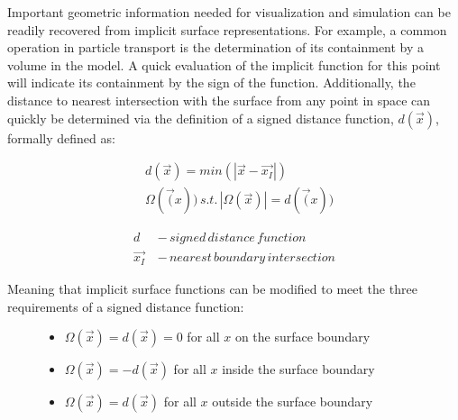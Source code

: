 Important geometric information needed for visualization and simulation can be
readily recovered from implicit surface representations. For example, a common
operation in particle transport is the determination of its containment by a
volume in the model. A quick evaluation of the implicit function for this point
will indicate its containment by the sign of the function.
Additionally, the distance to nearest intersection with the surface from any
point in space can quickly be determined via the definition of a signed distance
function, $d(\vec{x})$, formally defined as:

\begin{align}
  & d(\vec{x}) = min(|\vec{x} - \vec{x_{I}}|) \\
  & \Omega(\vec(x))  \,s.t.  \,|\Omega(\vec{x})| = d(\vec(x)) 
\end{align}

\begin{align}
  d \, &- \, signed \, distance \, function \\
  \vec{x_{I}} \, &- \,nearest \, boundary \,intersection
\end{align}

\noindent
Meaning that implicit surface functions can be modified to meet the three
requirements of a signed distance function:

\begin{figure}[H]
  \begin{center}
    \begin{minipage}{.8\textwidth}
      \begin{itemize}
      \item $ \Omega(\vec{x}) = d(\vec{x}) = 0 $ for all $x$ on the surface boundary
      \item $ \Omega(\vec{x}) = -d(\vec{x}) $ for all $x$ inside the surface boundary
      \item $ \Omega(\vec{x}) = d(\vec{x}) $ for all $x$ outside the surface boundary
      \end{itemize}
    \end{minipage}
  \end{center}
\end{figure}

